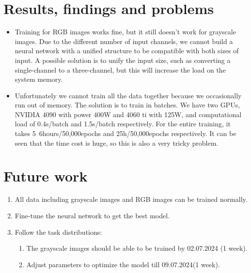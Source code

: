\documentclass[
	ngerman,
	accentcolor=9c,%
	type=intern,
	marginpar=false
	]{tudapub}
\begin{document}
\section{Results, findings and problems}
\begin{itemize}
    \item Training for RGB images works fine, but it still doesn't work for grayscale images.
    Due to the different number of input channels, we cannot build a neural network with a unified structure to be compatible with both sizes of input. A possible solution is to unify the input size, such as converting a single-channel to a three-channel, but this will increase the load on the system memory.
    \item Unfortunately we cannot train all the data together because we occasionally run out of memory. The solution is to train in batches. We have two GPUs, NVIDIA 4090 with power 400W and 4060 ti with 125W, and computational load of 0.4s/batch and 1.5s/batch respectively. For the entire training, it takes 5~6hours/50,000epochs and 25h/50,000epochs respectively. It can be seen that the time cost is huge, so this is also a very tricky problem.
\end{itemize}

\section{Future work}
\begin{enumerate}
    \item All data including grayscale images and RGB images can be trained normally.
    \item Fine-tune the neural network to get the best model.
    \item Follow the task distributions:
    \begin{enumerate}
        \item The grayscale images should be able to be trained by 02.07.2024 (1 week).
        \item Adjust parameters to optimize the model till 09.07.2024(1 week).
    \end{enumerate}
\end{enumerate}
\end{document}
